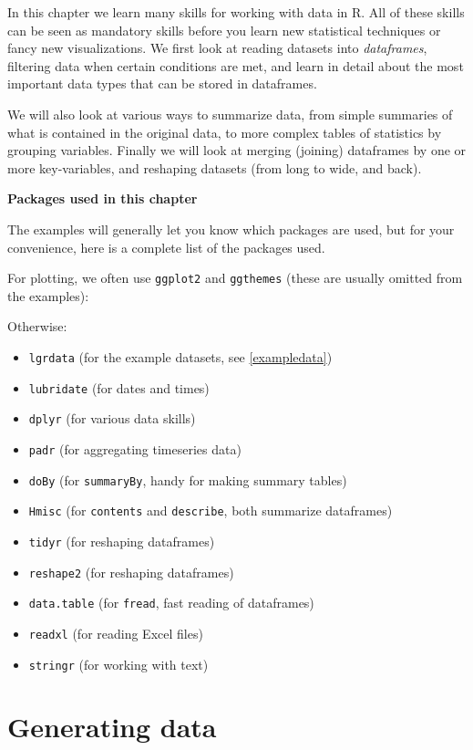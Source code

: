 \documentclass[]{book}
\providecommand{\tightlist}{%
  \setlength{\itemsep}{0pt}\setlength{\parskip}{0pt}}
\begin{document}
In this chapter we learn many skills for working with data in R. All of these skills can be seen as mandatory skills before you learn new statistical techniques or fancy new visualizations. We first look at reading datasets into \emph{dataframes}, filtering data when certain conditions are met, and learn in detail about the most important data types that can be stored in dataframes.

We will also look at various ways to summarize data, from simple summaries of what is contained in the original data, to more complex tables of statistics by grouping variables. Finally we will look at merging (joining) dataframes by one or more key-variables, and reshaping datasets (from long to wide, and back).

\textbf{Packages used in this chapter}

The examples will generally let you know which packages are used, but for your convenience, here is a complete list of the packages used.

For plotting, we often use \texttt{ggplot2} and \texttt{ggthemes} (these are usually omitted from the examples):

Otherwise:

\begin{itemize}
\tightlist
\item
  \texttt{lgrdata} (for the example datasets, see \ref{exampledata})
\item
  \texttt{lubridate} (for dates and times)
\item
  \texttt{dplyr} (for various data skills)
\item
  \texttt{padr} (for aggregating timeseries data)
\item
  \texttt{doBy} (for \texttt{summaryBy}, handy for making summary tables)
\item
  \texttt{Hmisc} (for \texttt{contents} and \texttt{describe}, both summarize dataframes)
\item
  \texttt{tidyr} (for reshaping dataframes)
\item
  \texttt{reshape2} (for reshaping dataframes)
\item
  \texttt{data.table} (for \texttt{fread}, fast reading of dataframes)
\item
  \texttt{readxl} (for reading Excel files)
\item
  \texttt{stringr} (for working with text)
\end{itemize}

\hypertarget{generating-data}{%
\section{Generating data}\label{generating-data}}
\end{document}
